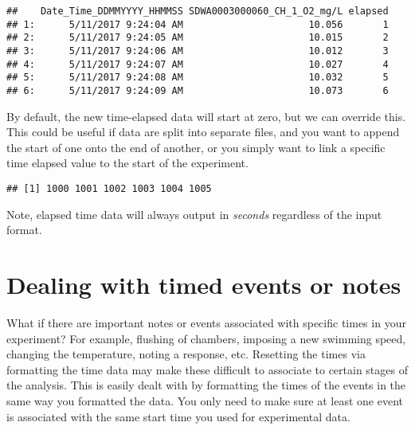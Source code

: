 \documentclass[]{book}
\newenvironment{Shaded}{\begin{snugshade}}{\end{snugshade}}
\newcommand{\KeywordTok}[1]{\textcolor[rgb]{0.13,0.29,0.53}{\textbf{#1}}}
\newcommand{\DataTypeTok}[1]{\textcolor[rgb]{0.13,0.29,0.53}{#1}}
\newcommand{\DecValTok}[1]{\textcolor[rgb]{0.00,0.00,0.81}{#1}}
\newcommand{\StringTok}[1]{\textcolor[rgb]{0.31,0.60,0.02}{#1}}
\newcommand{\OperatorTok}[1]{\textcolor[rgb]{0.81,0.36,0.00}{\textbf{#1}}}
\newcommand{\NormalTok}[1]{#1}
\begin{document}
\begin{verbatim}
##    Date_Time_DDMMYYYY_HHMMSS SDWA0003000060_CH_1_O2_mg/L elapsed
## 1:      5/11/2017 9:24:04 AM                      10.056       1
## 2:      5/11/2017 9:24:05 AM                      10.015       2
## 3:      5/11/2017 9:24:06 AM                      10.012       3
## 4:      5/11/2017 9:24:07 AM                      10.027       4
## 5:      5/11/2017 9:24:08 AM                      10.032       5
## 6:      5/11/2017 9:24:09 AM                      10.073       6
\end{verbatim}

By default, the new time-elapsed data will start at zero, but we can
override this. This could be useful if data are split into separate
files, and you want to append the start of one onto the end of another,
or you simply want to link a specific time elapsed value to the start of
the experiment.

\begin{Shaded}
\end{Shaded}

\begin{verbatim}
## [1] 1000 1001 1002 1003 1004 1005
\end{verbatim}

Note, elapsed time data will always output in \emph{seconds} regardless
of the input format.

\section{Dealing with timed events or
notes}\label{dealing-with-timed-events-or-notes}

What if there are important notes or events associated with specific
times in your experiment? For example, flushing of chambers, imposing a
new swimming speed, changing the temperature, noting a response, etc.
Resetting the times via formatting the time data may make these
difficult to associate to certain stages of the analysis. This is easily
dealt with by formatting the times of the events in the same way you
formatted the data. You only need to make sure at least one event is
associated with the same start time you used for experimental data.
\end{document}
